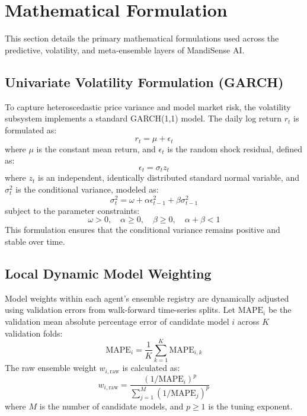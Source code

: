 \documentclass[12pt,a4paper]{report}
\theoremstyle{definition}
\theoremstyle{remark}
\begin{document}
\section{Mathematical Formulation}

This section details the primary mathematical formulations used across the predictive, volatility, and meta-ensemble layers of MandiSense AI.

\subsection{Univariate Volatility Formulation (GARCH)}

To capture heteroscedastic price variance and model market risk, the volatility subsystem implements a standard GARCH(1,1) model. The daily log return $r_t$ is formulated as:
\begin{equation}
    r_t = \mu + \epsilon_t
\end{equation}
where $\mu$ is the constant mean return, and $\epsilon_t$ is the random shock residual, defined as:
\begin{equation}
    \epsilon_t = \sigma_t z_t
\end{equation}
where $z_t$ is an independent, identically distributed standard normal variable, and $\sigma_t^2$ is the conditional variance, modeled as:
\begin{equation}
    \sigma_t^2 = \omega + \alpha \epsilon_{t-1}^2 + \beta \sigma_{t-1}^2
\end{equation}
subject to the parameter constraints:
\begin{equation}
    \omega > 0, \quad \alpha \geq 0, \quad \beta \geq 0, \quad \alpha + \beta < 1
\end{equation}
This formulation ensures that the conditional variance remains positive and stable over time.

\subsection{Local Dynamic Model Weighting}

Model weights within each agent's ensemble registry are dynamically adjusted using validation errors from walk-forward time-series splits. Let $\text{MAPE}_{i}$ be the validation mean absolute percentage error of candidate model $i$ across $K$ validation folds:
\begin{equation}
    \text{MAPE}_{i} = \frac{1}{K} \sum_{k=1}^K \text{MAPE}_{i, k}
\end{equation}
The raw ensemble weight $w_{i,\text{raw}}$ is calculated as:
\begin{equation}
    w_{i,\text{raw}} = \frac{(1 / \text{MAPE}_{i})^p}{\sum_{j=1}^M (1 / \text{MAPE}_{j})^p}
\end{equation}
where $M$ is the number of candidate models, and $p \geq 1$ is the tuning exponent. 
\end{document}
